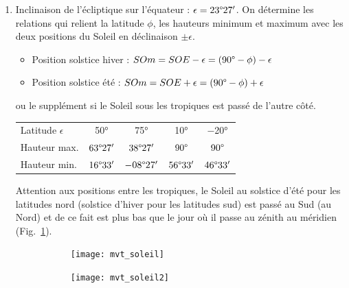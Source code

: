 \documentclass[a4paper,10pt]{report}
\renewcommand{\deg}{\ensuremath{\degree}}
\begin{document}
\begin{Answer}
  \begin{enumerate}
  \item Inclinaison de l'écliptique sur l'équateur :
    $\epsilon=23\deg27'$. On détermine les relations qui relient la
    latitude $\phi$, les hauteurs minimum et maximum avec les deux
    positions du Soleil en déclinaison $\pm \epsilon$.
    \begin{itemize}
    \item Position solstice hiver : $SOm = SOE - \epsilon =
      (90\deg-\phi) -\epsilon$
    \item Position solstice été : $SOm = SOE + \epsilon =
      (90\deg-\phi) +\epsilon$
    \end{itemize}
    ou le supplément si le Soleil sous les tropiques est passé de
    l'autre côté.
    \begin{center}
      \begin{tabular}{lcccc}
        \toprule
        Latitude $\epsilon$ & 50° & 75° & 10° & $-$20° \\
        Hauteur max. & $63\deg27'$ & $38\deg27'$ & $90\deg$ & $90\deg$ \\
        Hauteur min. & $16\deg33'$ & $-08\deg27'$ & $56\deg33'$ & $46\deg33'$ \\
        \bottomrule
      \end{tabular}
    \end{center}
    Attention aux positions entre les tropiques, le Soleil au solstice
    d'été pour les latitudes nord (solstice d'hiver pour les latitudes
    sud) est passé au Sud (au Nord) et de ce fait est plus bas que le
    jour où il passe au zénith au méridien (Fig.~\ref{mvtsolaire}).

    \begin{figure}
      \centering
      \begin{subfigure}[b]{0.45\textwidth}
        \centering
        \texttt{[image: mvt\_soleil]}
        \caption{}
        \label{mvtsolaire}
      \end{subfigure}
      \begin{subfigure}[b]{0.45\textwidth}
        \centering
        \texttt{[image: mvt\_soleil2]}
        \caption{}
        \label{mvtsolaire2}
      \end{subfigure}
      \caption{}
    \end{figure}


\end{enumerate}
\end{Answer}
\end{document}
